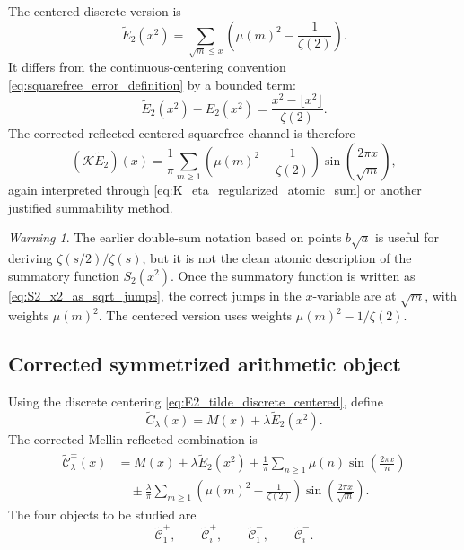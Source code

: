 \documentclass[11pt]{amsart}
\numberwithin{equation}{section}
\theoremstyle{plain}
\theoremstyle{definition}
\theoremstyle{remark}
\newtheorem{warning}[theorem]{Warning}
\begin{document}
The centered discrete version is
\begin{equation}
\widetilde E_2(x^2)=\sum_{\sqrt m\le x}\left(\mu(m)^2-\frac1{\zeta(2)}\right).
\label{eq:E2_tilde_discrete_centered}
\end{equation}
It differs from the continuous-centering convention \eqref{eq:squarefree_error_definition} by a bounded term:
\begin{equation}
\widetilde E_2(x^2)-E_2(x^2)=\frac{x^2-\lfloor x^2\rfloor}{\zeta(2)}.
\label{eq:E2_tilde_vs_E2_bounded_difference}
\end{equation}
The corrected reflected centered squarefree channel is therefore
\begin{equation}
(\mathcal K\widetilde E_2)(x)
=\frac1\pi\sum_{m\ge1}\left(\mu(m)^2-\frac1{\zeta(2)}\right)
\sin\left(\frac{2\pi x}{\sqrt m}\right),
\label{eq:K_E2_tilde_corrected}
\end{equation}
again interpreted through \eqref{eq:K_eta_regularized_atomic_sum} or another justified summability method.

\begin{warning}
\label{warn:previous_squarefree_double_sum_superseded}
The earlier double-sum notation based on points \(b\sqrt a\) is useful for deriving \(\zeta(s/2)/\zeta(s)\), but it is not the clean atomic description of the summatory function \(S_2(x^2)\).  Once the summatory function is written as \eqref{eq:S2_x2_as_sqrt_jumps}, the correct jumps in the \(x\)-variable are at \(\sqrt m\), with weights \(\mu(m)^2\).  The centered version uses weights \(\mu(m)^2-1/\zeta(2)\).
\end{warning}

\subsection{Corrected symmetrized arithmetic object}
\label{subsec:corrected_symmetrized_arithmetic_object}

Using the discrete centering \eqref{eq:E2_tilde_discrete_centered}, define
\begin{equation}
\widetilde C_\lambda(x)=M(x)+\lambda\widetilde E_2(x^2).
\label{eq:C_lambda_tilde_corrected_definition}
\end{equation}
The corrected Mellin-reflected combination is
\begin{align}
\widetilde{\mathcal C}_\lambda^{\pm}(x)
&=M(x)+\lambda\widetilde E_2(x^2)
\pm\frac1\pi\sum_{n\ge1}\mu(n)\sin\left(\frac{2\pi x}{n}\right)
\label{eq:C_lambda_pm_corrected_first_lines}\\
&\quad\pm\frac{\lambda}{\pi}\sum_{m\ge1}\left(\mu(m)^2-\frac1{\zeta(2)}\right)
\sin\left(\frac{2\pi x}{\sqrt m}\right).
\label{eq:C_lambda_pm_corrected_final}
\end{align}
The four objects to be studied are
\begin{equation}
\widetilde{\mathcal C}_1^{+},
\qquad
\widetilde{\mathcal C}_i^{+},
\qquad
\widetilde{\mathcal C}_1^{-},
\qquad
\widetilde{\mathcal C}_i^{-}.
\label{eq:four_corrected_symmetrized_objects}
\end{equation}
\end{document}
